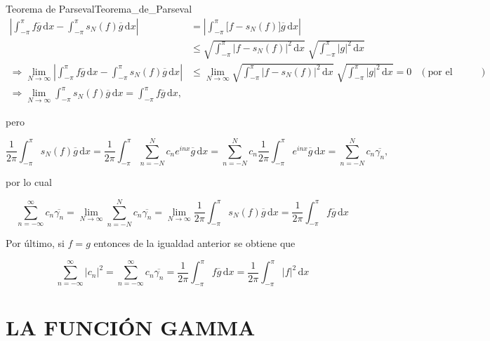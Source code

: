 \documentclass[fleqn]{article}
\newcounter{teore}
\newenvironment{teorema}[2]{\begin{teo}[breakable, pad at break = 5mm, leftrule = 0.7mm, rightrule = 0.7mm, right = 2mm, left = 2mm, enlarge bottom finally by = 3mm, fontupper = \setlength{\parskip}{2mm}, fontlower = \setlength{\parskip}{2mm}]{#1}{#2}}{\end{teo}}
\newcommand{\intg}[4]{\int_{#1}^{#2} \!\! #3 \, \mathrm{d} #4}
\begin{document}
\begin{teorema}{Teorema de Parseval}{Teorema_de_Parseval}
		\begin{align*}
			\left\lvert \intg{-\pi}{\pi}{f \overline{g}}{x} - \intg{-\pi}{\pi}{s_N (f) \overline{g}}{x} \right\rvert &= \left\lvert \intg{-\pi}{\pi}{\bigl[ f - s_N (f) \bigr] \overline{g}}{x} \right\rvert & \\
			&\leq \sqrt{\intg{-\pi}{\pi}{\left\lvert f - s_N (f) \right\rvert^2}{x}} \; \sqrt{\intg{-\pi}{\pi}{\lvert g \rvert^2}{x}} & \\
			\Longrightarrow \lim_{N \to \infty} \left\lvert \intg{-\pi}{\pi}{f \overline{g}}{x} - \intg{-\pi}{\pi}{s_N (f) \overline{g}}{x} \right\rvert &\leq \lim_{N \to \infty} \sqrt{\intg{-\pi}{\pi}{\left\lvert f - s_N (f) \right\rvert^2}{x}} \; \sqrt{\intg{-\pi}{\pi}{\lvert g \rvert^2}{x}} = 0 & (\mbox{por el límite anterior}) \\
			\Longrightarrow \lim_{N \to \infty} \intg{-\pi}{\pi}{s_N (f) \overline{g}}{x} = \intg{-\pi}{\pi}{f \overline{g}}{x},
		\end{align*}

		pero

		\begin{equation*}
			\dfrac{1}{2 \pi} \intg{-\pi}{\pi}{s_N (f) \overline{g}}{x} = \dfrac{1}{2 \pi} \intg{-\pi}{\pi}{\sum_{n = -N}^{N} c_n e^{inx} \overline{g}}{x} = \sum_{n = -N}^{N} c_n \dfrac{1}{2 \pi} \intg{-\pi}{\pi}{e^{inx} \overline{g}}{x} = \sum_{n = -N}^{N} c_n \overline{\gamma_n},
		\end{equation*}

		por lo cual

		\begin{equation*}
			\sum_{n = -\infty}^{\infty} c_n \overline{\gamma_n} = \lim_{N \to \infty} \sum_{n = -N}^{N} c_n \overline{\gamma_n} = \lim_{N \to \infty} \dfrac{1}{2 \pi} \intg{-\pi}{\pi}{s_N (f) \overline{g}}{x} = \dfrac{1}{2 \pi} \intg{-\pi}{\pi}{f \overline{g}}{x}
		\end{equation*}

		Por último, si $ f = g $ entonces de la igualdad anterior se obtiene que 

		\begin{equation*}
			\sum_{n = -\infty}^{\infty} \lvert c_n \rvert^2 = \sum_{n = -\infty}^{\infty} c_n \overline{\gamma_n} = \dfrac{1}{2 \pi} \intg{-\pi}{\pi}{f \overline{g}}{x} = \dfrac{1}{2 \pi} \intg{-\pi}{\pi}{ \lvert f \rvert^2}{x}
		\end{equation*}
	\end{teorema}

	\section*{LA FUNCIÓN GAMMA}
\end{document}
